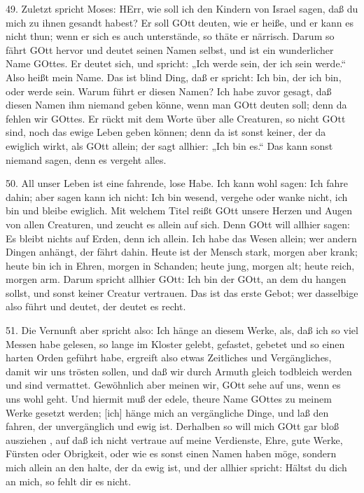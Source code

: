 49. Zuletzt spricht Moses: HErr, wie soll ich den Kindern von Israel sagen, daß du mich zu ihnen gesandt habest? Er soll GOtt deuten, wie er heiße, und er kann es nicht thun; wenn er sich es auch unterstände, so thäte er närrisch. Darum so fährt GOtt hervor und deutet seinen Namen selbst, und ist ein wunderlicher Name GOttes. Er deutet sich, und spricht: „Ich werde sein, der ich sein werde.“ Also heißt mein Name. Das ist blind Ding, daß er spricht: Ich bin, der ich bin, oder werde sein. Warum führt er diesen Namen? Ich habe zuvor gesagt, daß diesen Namen ihm niemand geben könne, wenn man GOtt deuten soll; denn da fehlen wir GOttes. Er rückt mit dem Worte über alle Creaturen, so nicht GOtt sind, noch das ewige Leben geben können; denn da ist sonst keiner, der da ewiglich wirkt, als GOtt allein; der sagt allhier: „Ich bin es.“ Das kann sonst niemand sagen, denn es vergeht alles.

50. All unser Leben ist eine fahrende, lose Habe. Ich kann wohl sagen: Ich fahre dahin; aber sagen kann ich nicht: Ich bin wesend, vergehe oder wanke nicht, ich bin und bleibe ewiglich. Mit welchem Titel reißt GOtt unsere Herzen und Augen von allen Creaturen, und zeucht es allein auf sich. Denn GOtt will allhier sagen: Es bleibt nichts auf Erden, denn ich allein. Ich habe das Wesen allein; wer andern Dingen anhängt, der fährt dahin. Heute ist der Mensch stark, morgen aber krank; heute bin ich in Ehren, morgen in Schanden; heute jung, morgen alt; heute reich, morgen arm. Darum spricht allhier GOtt: Ich bin der GOtt, an dem du hangen sollst, und sonst keiner Creatur vertrauen. Das ist das erste Gebot; wer dasselbige also führt und deutet, der deutet es recht.

51. Die Vernunft aber spricht also: Ich hänge an diesem Werke, als, daß ich so viel Messen habe gelesen, so lange im Kloster gelebt, gefastet, gebetet und so einen harten Orden geführt habe, ergreift also etwas Zeitliches und Vergängliches, damit wir uns trösten sollen, und daß wir durch Armuth gleich todbleich werden und sind vermattet. Gewöhnlich aber meinen wir, GOtt sehe auf uns, wenn es uns wohl geht. Und hiermit muß der edele, theure Name GOttes zu meinem Werke gesetzt werden; [ich] hänge mich an vergängliche Dinge, und laß den fahren, der unvergänglich und ewig ist. Derhalben so will mich GOtt gar bloß ausziehen
, auf daß ich nicht vertraue auf meine Verdienste, Ehre, gute Werke, Fürsten oder Obrigkeit, oder wie es sonst einen Namen haben möge, sondern mich allein an den halte, der da ewig ist, und der allhier spricht: Hältst du dich an mich, so fehlt dir es nicht.


